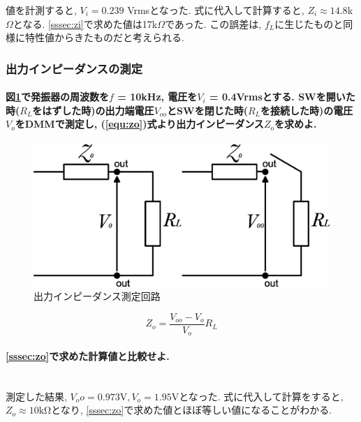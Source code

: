 \documentclass[titlepage]{jsarticle}
\begin{document}
                値を計測すると, $V_i = 0.239$ Vrmsとなった.
                式に代入して計算すると, $Z_i \approx 14.8$k$\Omega$となる.
                \ref{sssec:zi}で求めた値は17k$\Omega$であった.
                この誤差は, $f_L$に生じたものと同様に特性値からきたものだと考えられる.

        \subsubsection{出力インピーダンスの測定}
            \paragraph{図\ref{fig:tr_zo}で発振器の周波数を$f$ = 10kHz, 電圧を$V_i$ = 0.4Vrmsとする. SWを開いた時($R_L$をはずした時)の出力端電圧$V_{oo}$とSWを閉じた時($R_L$を接続した時)の電圧$V_o$をDMMで測定し, (\ref{equ:zo})式より出力インピーダンス$Z_o$を求めよ.}

            \begin{figure}[h]
                \centering
                \includegraphics[width=0.75\hsize]{images/tr_zo.eps}
                \caption{出力インピーダンス測定回路}
                \label{fig:tr_zo}
            \end{figure}

            \begin{equation}
                Z_o = \frac{V_{oo} - V_o}{V_o} R_L \label{equ:zo}
            \end{equation}

            \paragraph{\ref{sssec:zo}で求めた計算値と比較せよ.}
            \mbox{} \\

                測定した結果, $V_oo = 0.973 \mathrm{V}, V_o = 1.95 \mathrm{V}$となった.
                式に代入して計算をすると, $Z_o \approx 10 \mathrm{k\Omega}$となり,
                \ref{sssec:zo}で求めた値とほぼ等しい値になることがわかる.
\end{document}
